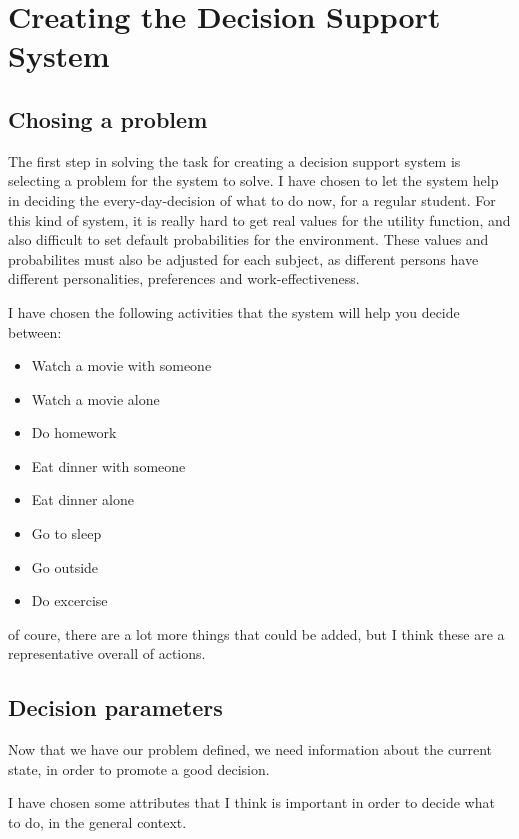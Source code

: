 \section{Creating the Decision Support System}
\subsection{Chosing a problem}
The first step in solving the task for creating a decision support system is
selecting a problem for the system to solve. I have chosen to let the system
help in deciding the every-day-decision of what to do now, for a
regular student. For this kind of system, it is really hard to get real values
for the utility function, and also difficult to set default probabilities for
the environment. These values and probabilites must also be adjusted for each
subject, as different persons have different personalities, preferences and
work-effectiveness.


I have chosen the following activities that the system will help you decide
between:
\begin{itemize}
  \item Watch a movie with someone
  \item Watch a movie alone
  \item Do homework
  \item Eat dinner with someone
  \item Eat dinner alone
  \item Go to sleep
  \item Go outside
  \item Do excercise
\end{itemize}
of coure, there are a lot more things that could be added, but I think these are
a representative overall of actions.

\subsection{Decision parameters}
Now that we have our problem defined, we need information
about the current state, in order to promote a good decision.

I have chosen some attributes that I think is important in order to decide what
to do, in the general context.

